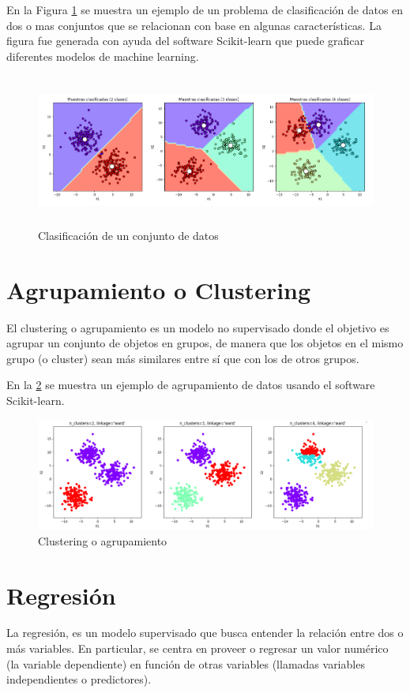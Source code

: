 En la Figura \ref{fig:Clasi} se muestra un ejemplo de un problema de clasificación de datos 
en dos o mas conjuntos que se relacionan con base en algunas características. La figura fue generada con 
ayuda del software Scikit-learn que puede graficar diferentes modelos de machine learning.


  \begin{figure}[H]
    \centering
       \includegraphics[width=12cm , height=5cm]{Imagenes/Clasificacion.PNG}
      \caption{Clasificación de un conjunto de datos}
      \label{fig:Clasi}
  \end{figure}
 

\section{Agrupamiento o Clustering}

El clustering o agrupamiento es un modelo no supervisado donde 
el objetivo es agrupar un conjunto de objetos en grupos, 
de manera que los objetos en el mismo grupo (o cluster) sean 
más similares entre sí que con los de otros grupos.\medskip

En la \ref{fig:Clast} se muestra un ejemplo de agrupamiento de datos 
usando el software Scikit-learn.


\begin{figure}[H]
    \centering
    \includegraphics[width=12cm]{Imagenes/Clustering.PNG}
    \caption{Clustering o agrupamiento}
    \label{fig:Clast}
\end{figure}

\section{Regresión}
La regresión, es un modelo supervisado que busca entender la relación entre dos o más 
variables. En particular, se centra en proveer o regresar un valor numérico 
(la variable dependiente) en función de otras variables 
(llamadas variables independientes o predictores). \medskip

